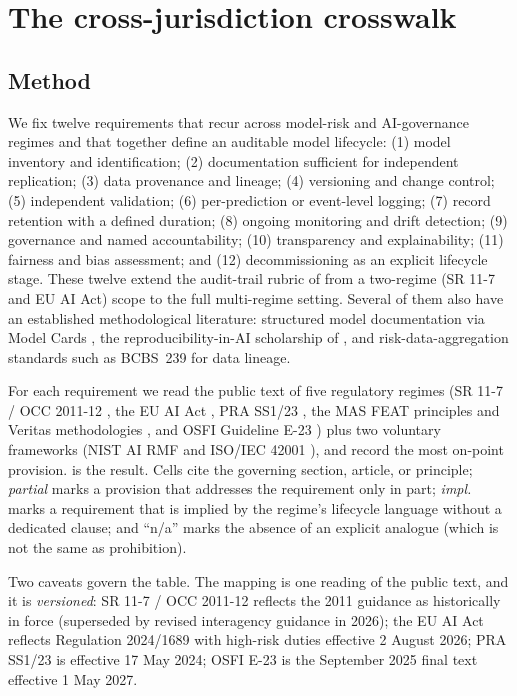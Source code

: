 \section{The cross-jurisdiction crosswalk}\label{sec:crosswalk}

\subsection{Method}\label{sec:crosswalk_method}

We fix twelve requirements that recur across model-risk and AI-governance regimes and that together define an auditable model lifecycle: (1) model inventory and identification; (2) documentation sufficient for independent replication; (3) data provenance and lineage; (4) versioning and change control; (5) independent validation; (6) per-prediction or event-level logging; (7) record retention with a defined duration; (8) ongoing monitoring and drift detection; (9) governance and named accountability; (10) transparency and explainability; (11) fairness and bias assessment; and (12) decommissioning as an explicit lifecycle stage. These twelve extend the audit-trail rubric of \citet{KhanMrAudit2026} from a two-regime (SR 11-7 and EU AI Act) scope to the full multi-regime setting. Several of them also have an established methodological literature: structured model documentation via Model Cards \citep{MitchellModelCards2019}, the reproducibility-in-AI scholarship of \citet{GundersenKjensmo2018}, and risk-data-aggregation standards such as BCBS~239 \citep{BCBS239} for data lineage.

For each requirement we read the public text of five regulatory regimes (SR 11-7 / OCC 2011-12 \citep{FedSR117, OCC2011}, the EU AI Act \citep{EUAIAct}, PRA SS1/23 \citep{PRASS123}, the MAS FEAT principles and Veritas methodologies \citep{MASFEAT, MASVeritas}, and OSFI Guideline E-23 \citep{OSFIE23}) plus two voluntary frameworks (NIST AI RMF \citep{NIST_AI_100_1} and ISO/IEC 42001 \citep{ISO42001}), and record the most on-point provision.  is the result. Cells cite the governing section, article, or principle; \textit{partial} marks a provision that addresses the requirement only in part; \textit{impl.} marks a requirement that is implied by the regime's lifecycle language without a dedicated clause; and ``n/a'' marks the absence of an explicit analogue (which is not the same as prohibition).

Two caveats govern the table. The mapping is one reading of the public text, and it is \emph{versioned}: SR 11-7 / OCC 2011-12 reflects the 2011 guidance as historically in force (superseded by revised interagency guidance in 2026); the EU AI Act reflects Regulation 2024/1689 with high-risk duties effective 2 August 2026; PRA SS1/23 is effective 17 May 2024; OSFI E-23 is the September 2025 final text effective 1 May 2027.

